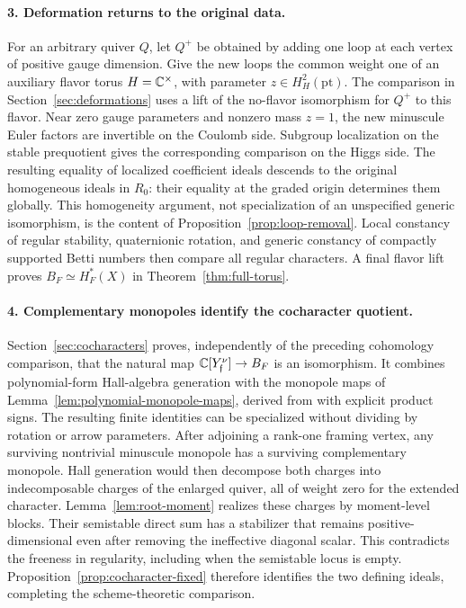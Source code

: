\paragraph{3. Deformation returns to the original data.}
For an arbitrary quiver $Q$, let $Q^+$ be obtained by adding one loop at
each vertex of positive gauge dimension.  Give the new loops the common
weight one of an auxiliary flavor torus $H=\mathbb C^\times$, with parameter
$z\in H_H^2(\mathrm{pt})$.
The comparison in Section~\ref{sec:deformations} uses a lift of the
no-flavor isomorphism for $Q^+$ to this flavor.  Near zero gauge parameters and nonzero mass
$z=1$, the new minuscule Euler factors are invertible on the Coulomb
side.  Subgroup localization on the stable prequotient gives the
corresponding comparison on the Higgs side.  The resulting equality of
localized coefficient ideals descends to the original homogeneous ideals
in $R_0$: their equality at the graded origin determines them globally.
This homogeneity argument, not specialization of an unspecified generic
isomorphism, is the content of Proposition~\ref{prop:loop-removal}.
Local constancy of regular stability, quaternionic rotation, and generic
constancy of compactly supported Betti numbers then compare all regular
characters.  A final flavor lift proves
$B_F\simeq H_F^*(X)$ in Theorem~\ref{thm:full-torus}.

\paragraph{4. Complementary monopoles identify the cocharacter quotient.}
Section~\ref{sec:cocharacters} proves, independently of the preceding
cohomology comparison, that the natural map
$\mathbb C[Y_{\mathfrak f}^{\nu}]\to B_F$ is an isomorphism.
It combines polynomial-form Hall-algebra generation
\cite{JindalNegut26} with the monopole maps of
Lemma~\ref{lem:polynomial-monopole-maps}, derived from
\cite[Theorem~5.7]{Tsymbaliuk23Difference} with explicit product signs.
The resulting finite identities can be specialized without dividing by
rotation or arrow parameters.
After adjoining a rank-one framing vertex, any surviving nontrivial minuscule
monopole has a surviving complementary monopole.  Hall generation would
then decompose both charges into indecomposable charges of the enlarged
quiver, all of weight zero for the extended character.
Lemma~\ref{lem:root-moment} realizes these charges by moment-level blocks.
Their semistable direct sum has a stabilizer that remains
positive-dimensional even after removing the ineffective diagonal
scalar.  This contradicts the freeness in regularity, including when
the semistable locus is empty.  Proposition~\ref{prop:cocharacter-fixed}
therefore identifies the two defining ideals, completing the
scheme-theoretic comparison.



